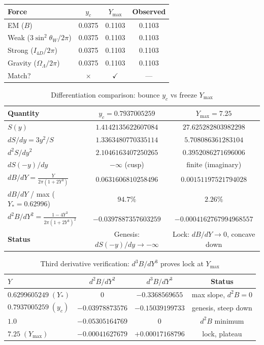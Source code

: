 \documentclass[12pt,oneside,openany]{book}
\begin{document}
\begin{table}[htbp]
\centering
\begin{tabular}{@{}lccc@{}}
\toprule
Force & $y_c$ & $Y_{\max}$ & Observed \\
\midrule
EM ($B$) & 0.0375 & 0.1103 & 0.1103 \\
Weak ($3\sin^2\theta_W/2\pi$) & 0.0375 & 0.1103 & 0.1103 \\
Strong ($I_{4D}/2\pi$) & 0.0375 & 0.1103 & 0.1103 \\
Gravity ($\Omega_\Lambda/2\pi$) & 0.0375 & 0.1103 & 0.1103 \\
\midrule
Match? & $\times$ & $\checkmark$ & --- \\
\bottomrule
\end{tabular}
\end{table}
\begin{table}[htbp]
\centering
\caption{Differentiation comparison: bounce $y_c$ vs freeze $Y_{\max}$}
\label{tab:diff-bounce-freeze}
\small
\begin{tabular}{@{}lcc@{}}
\toprule
\textbf{Quantity} & \textbf{$y_c=0.7937005259$} & \textbf{$Y_{\max}=7.25$} \\
\midrule
$S(y)$ & $1.4142135622607084$ & $27.625282803982298$ \\
$dS/dy = 3y^2/S$ & $1.3363480770335114$ & $5.708086361283104$ \\
$d^2S/dy^2$ & $2.1046163407250265$ & $0.3952086271696006$ \\
$dS(-y)/dy$ & $-\infty$ (cusp) & finite (imaginary) \\
\midrule
$dB/dY = \frac{Y}{2\pi(1+2Y^3)}$ & $0.0631606810258496$ & $0.00151197521794028$ \\
$dB/dY$ / max ($Y_*=0.62996$) & $94.7\%$ & $2.26\%$ \\
$d^2B/dY^2 = \frac{1-4Y^3}{2\pi(1+2Y^3)^2}$ & $-0.0397887357603259$ & $-0.0004162767994968557$ \\
\midrule
\textbf{Status} & Genesis: $dS(-y)/dy\to-\infty$ & Lock: $dB/dY\to0$, concave down \\
\bottomrule
\end{tabular}
\end{table}
\begin{table}[htbp]
\centering
\caption{Third derivative verification: $d^3B/dY^3$ proves lock at $Y_{\max}$}
\label{tab:d3B-verified}
\small
\begin{tabular}{@{}lccc@{}}
\toprule
$Y$ & $d^2B/dY^2$ & $d^3B/dY^3$ & Status \\
\midrule
$0.6299605249\;(Y_*)$ & $0$ & $-0.3368569655$ & max slope, $d^2B=0$ \\
$0.7937005259\;(y_c)$ & $-0.03978873576$ & $-0.15039199733$ & genesis, steep down \\
$1.0$ & $\mathbf{-0.05305164769}$ & $0$ & $d^2B$ minimum \\
$7.25\;(Y_{\max})$ & $-0.00041627679$ & $+0.00017168796$ & lock, plateau \\
\bottomrule
\end{tabular}
\end{table}
\end{document}
